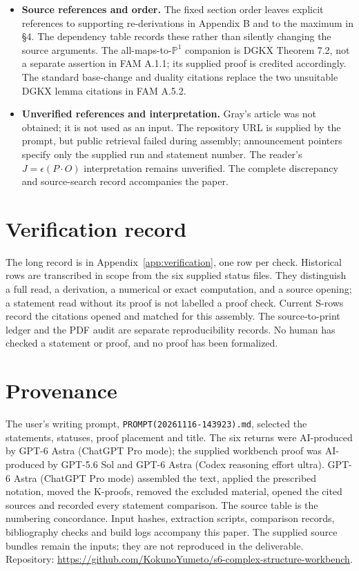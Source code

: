 \begin{itemize}[leftmargin=*]
\item \textbf{Source references and order.} The fixed section order leaves explicit references to supporting re-derivations in Appendix B and to the maximum in \S4. The dependency table records these rather than silently changing the source arguments. The all-maps-to-$\mathbb P^1$ companion is DGKX Theorem 7.2, not a separate assertion in FAM A.1.1; its supplied proof is credited accordingly. The standard base-change and duality citations replace the two unsuitable DGKX lemma citations in FAM A.5.2.
\item \textbf{Unverified references and interpretation.} Gray's article was not obtained; it is not used as an input. The repository URL is supplied by the prompt, but public retrieval failed during assembly; announcement pointers specify only the supplied run and statement number. The reader's $J=\epsilon(P\cdot O)$ interpretation remains unverified. The complete discrepancy and source-search record accompanies the paper.
\end{itemize}

\section*{Verification record}
The long record is in Appendix~\ref{app:verification}, one row per check. Historical rows are transcribed in scope from the six supplied status files. They distinguish a full read, a derivation, a numerical or exact computation, and a source opening; a statement read without its proof is not labelled a proof check. Current S-rows record the citations opened and matched for this assembly. The source-to-print ledger and the PDF audit are separate reproducibility records. No human has checked a statement or proof, and no proof has been formalized.

\section*{Provenance}
The user's writing prompt, \texttt{PROMPT(20261116-143923).md}, selected the statements, statuses, proof placement and title. The six returns were AI-produced by GPT-6 Astra (ChatGPT Pro mode); the supplied workbench proof was AI-produced by GPT-5.6 Sol and GPT-6 Astra (Codex reasoning effort ultra). GPT-6 Astra (ChatGPT Pro mode) assembled the text, applied the prescribed notation, moved the K-proofs, removed the excluded material, opened the cited sources and recorded every statement comparison. The source table is the numbering concordance. Input hashes, extraction scripts, comparison records, bibliography checks and build logs accompany this paper. The supplied source bundles remain the inputs; they are not reproduced in the deliverable. Repository: \url{https://github.com/KokunoYumeto/s6-complex-structure-workbench}.

